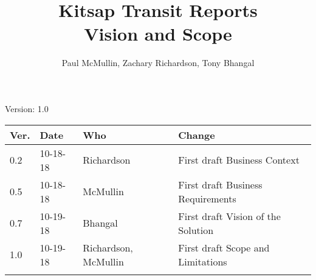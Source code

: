 \documentclass[letterpaper,12pt]{article}
\title{Kitsap Transit Reports\\Vision and Scope}
\author{Paul McMullin, Zachary Richardson, Tony Bhangal}
\begin{document}
\maketitle

\begin{center}
  Version: 1.0
\end{center}

\vfill
\begin{tabularx}{\linewidth}{|l|l|l|X|}\hline
Ver. & Date & Who & Change \\\hline
0.2 & 10-18-18 & Richardson & First draft Business Context \\\hline
0.5  & 10-18-18 & McMullin & First draft Business Requirements \\\hline
0.7 &  10-19-18 &  Bhangal & First draft Vision of the Solution \\\hline
1.0  & 10-19-18 &  Richardson, McMullin & First draft Scope and Limitations \\\hline
     &      &     &             \\\hline
\end{tabularx}
\newpage





\end{document}
